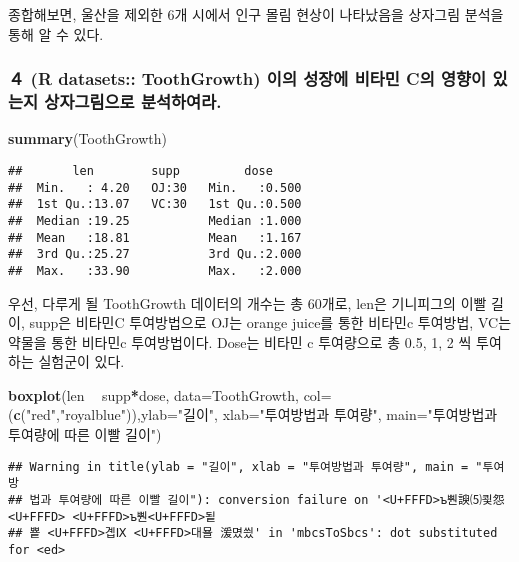 \documentclass[]{article}
\newenvironment{Shaded}{\begin{snugshade}}{\end{snugshade}}
\newcommand{\KeywordTok}[1]{\textcolor[rgb]{0.13,0.29,0.53}{\textbf{#1}}}
\newcommand{\DataTypeTok}[1]{\textcolor[rgb]{0.13,0.29,0.53}{#1}}
\newcommand{\StringTok}[1]{\textcolor[rgb]{0.31,0.60,0.02}{#1}}
\newcommand{\OperatorTok}[1]{\textcolor[rgb]{0.81,0.36,0.00}{\textbf{#1}}}
\newcommand{\NormalTok}[1]{#1}
\begin{document}
종합해보면, 울산을 제외한 6개 시에서 인구 몰림 현상이 나타났음을
상자그림 분석을 통해 알 수 있다.

\subsubsection{４ (R datasets:: ToothGrowth) 이의 성장에 비타민 C의
영향이 있는지 상자그림으로
분석하여라.}\label{r-datasets-toothgrowth----c----.}

\begin{Shaded}
\begin{Highlighting}[]
\KeywordTok{summary}\NormalTok{(ToothGrowth)}
\end{Highlighting}
\end{Shaded}

\begin{verbatim}
##       len        supp         dose      
##  Min.   : 4.20   OJ:30   Min.   :0.500  
##  1st Qu.:13.07   VC:30   1st Qu.:0.500  
##  Median :19.25           Median :1.000  
##  Mean   :18.81           Mean   :1.167  
##  3rd Qu.:25.27           3rd Qu.:2.000  
##  Max.   :33.90           Max.   :2.000
\end{verbatim}

우선, 다루게 될 ToothGrowth 데이터의 개수는 총 60개로, len은 기니피그의
이빨 길이, supp은 비타민C 투여방법으로 OJ는 orange juice를 통한 비타민c
투여방법, VC는 약물을 통한 비타민c 투여방법이다. Dose는 비타민 c
투여량으로 총 0.5, 1, 2 씩 투여하는 실험군이 있다.

\begin{Shaded}
\begin{Highlighting}[]
\KeywordTok{boxplot}\NormalTok{(len }\OperatorTok{~}\StringTok{ }\NormalTok{supp}\OperatorTok{*}\NormalTok{dose, }\DataTypeTok{data=}\NormalTok{ToothGrowth, }\DataTypeTok{col=}\NormalTok{(}\KeywordTok{c}\NormalTok{(}\StringTok{"red"}\NormalTok{,}\StringTok{"royalblue"}\NormalTok{)),}\DataTypeTok{ylab=}\StringTok{"길이"}\NormalTok{, }\DataTypeTok{xlab=}\StringTok{"투여방법과 투여량"}\NormalTok{, }\DataTypeTok{main=}\StringTok{"투여방법과 투여량에 따른 이빨 길이"}\NormalTok{)}
\end{Highlighting}
\end{Shaded}

\begin{verbatim}
## Warning in title(ylab = "길이", xlab = "투여방법과 투여량", main = "투여방
## 법과 투여량에 따른 이빨 길이"): conversion failure on '<U+FFFD>ъ뿬諛⑸쾿怨<U+FFFD> <U+FFFD>ъ뿬<U+FFFD>됱
## 뿉 <U+FFFD>곕Ⅸ <U+FFFD>대묠 湲몄씠' in 'mbcsToSbcs': dot substituted for <ed>
\end{verbatim}
\end{document}
